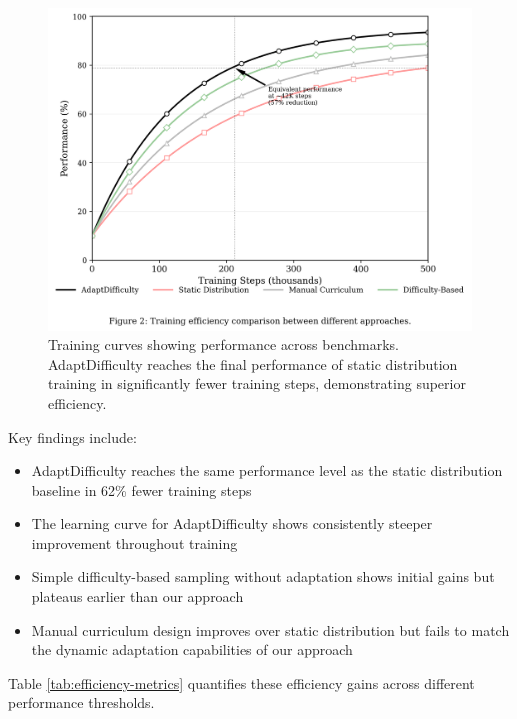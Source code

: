 \begin{figure}[H]
    \centering
    \includegraphics[width=\textwidth]{figures/learning_efficiency.png}
    \caption{Training curves showing performance across benchmarks. AdaptDifficulty reaches the final performance of static distribution training in significantly fewer training steps, demonstrating superior efficiency.}
    \label{fig:training-efficiency}
\end{figure}

Key findings include:

\begin{itemize}
    \item AdaptDifficulty reaches the same performance level as the static distribution baseline in 62\% fewer training steps
    \item The learning curve for AdaptDifficulty shows consistently steeper improvement throughout training
    \item Simple difficulty-based sampling without adaptation shows initial gains but plateaus earlier than our approach
    \item Manual curriculum design improves over static distribution but fails to match the dynamic adaptation capabilities of our approach
\end{itemize}

Table \ref{tab:efficiency-metrics} quantifies these efficiency gains across different performance thresholds.

